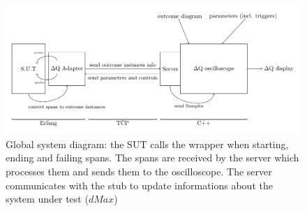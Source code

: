     \begin{figure}[H]
    \begin{center}
        \includegraphics{tikz/sut-stub-osc.pdf}
    \end{center}
    \caption{Global system diagram: the SUT calls the wrapper when starting, ending and failing spans. The spans are received by the server which processes them and sends them to the oscilloscope. The server communicates with the stub to update informations about the system under test ($dMax$)}
    \end{figure}
